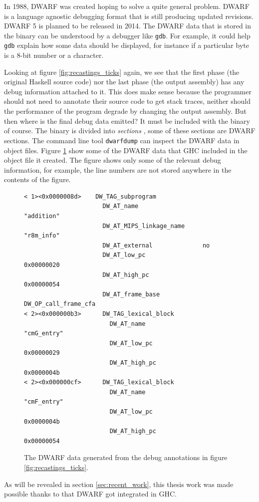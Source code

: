 In 1988, DWARF was created hoping to solve a quite general problem. DWARF is
a language agnostic debugging format that is still producing updated revisions.
DWARF 5 is planned to be released in 2014. \cite{eager2012introduction} The DWARF data that is
stored in the binary can be understood by a debugger like \texttt{gdb}. For example,
it could help \texttt{gdb} explain how some data should be displayed, for instance if a
particular byte is a 8-bit number or a character.

Looking at figure \ref{fig:recastings_ticks} again, we see that
the first phase (the original Haskell source code) nor the last
phase (the output assembly) has any debug information attached to
it. This does make sense because the programmer should not need to
annotate their source code to get stack traces, neither should the
performance of the program degrade by changing the output assembly.
But then where is the final debug data emitted? It must be included
with the binary of course. The binary is divided into \emph{sections}
\cite{oracle_object_file_format}, some of these sections are DWARF
sections. The command line tool \texttt{dwarfdump} can inspect the
DWARF data in object files. Figure \ref{fig:dwarfdump} show some of the
DWARF data that GHC included in the object file it created. The figure
shows only some of the relevant debug information, for example, the line
numbers are not stored anywhere in the contents of the figure.

\begin{figure}
\begin{mdframed}
  \begin{verbatim}
< 1><0x0000008d>    DW_TAG_subprogram
                      DW_AT_name                  "addition"
                      DW_AT_MIPS_linkage_name     "r8m_info"
                      DW_AT_external              no
                      DW_AT_low_pc                0x00000020
                      DW_AT_high_pc               0x00000054
                      DW_AT_frame_base            DW_OP_call_frame_cfa
< 2><0x000000b3>      DW_TAG_lexical_block
                        DW_AT_name                  "cmG_entry"
                        DW_AT_low_pc                0x00000029
                        DW_AT_high_pc               0x0000004b
< 2><0x000000cf>      DW_TAG_lexical_block
                        DW_AT_name                  "cmF_entry"
                        DW_AT_low_pc                0x0000004b
                        DW_AT_high_pc               0x00000054
  \end{verbatim}
  \caption{The DWARF data generated from the debug annotations in figure
    \ref{fig:recastings_ticks}.}
  \label{fig:dwarfdump}
\end{mdframed}
\end{figure}


As will be revealed in
section \ref{sec:recent_work}, this thesis work was made possible thanks
to that DWARF got integrated in GHC.
